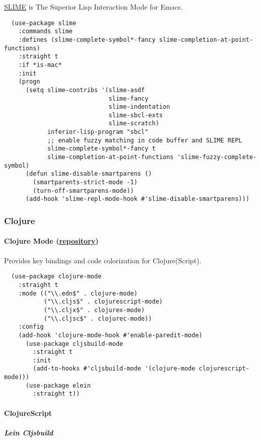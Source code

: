 \documentclass[11pt]{article}
\begin{document}
\href{https://common-lisp.net/project/slime/}{SLIME} is The Superior Lisp Interaction Mode for Emacs.

\begin{verbatim}
  (use-package slime
    :commands slime
    :defines (slime-complete-symbol*-fancy slime-completion-at-point-functions)
    :straight t
    :if *is-mac*
    :init
    (progn
      (setq slime-contribs '(slime-asdf
                             slime-fancy
                             slime-indentation
                             slime-sbcl-exts
                             slime-scratch)
            inferior-lisp-program "sbcl"
            ;; enable fuzzy matching in code buffer and SLIME REPL
            slime-complete-symbol*-fancy t
            slime-completion-at-point-functions 'slime-fuzzy-complete-symbol)
      (defun slime-disable-smartparens ()
        (smartparents-strict-mode -1)
        (turn-off-smartparens-mode))
      (add-hook 'slime-repl-mode-hook #'slime-disable-smartparens)))
\end{verbatim}
\subsubsection*{Clojure}
\label{sec:org96fec5d}
\paragraph*{Clojure Mode (\href{https://gihub.com/clojure-emacs/clojure-mode}{repository})}
\label{sec:org9356563}

Provides key bindings and code colorization for Clojure(Script).

\begin{verbatim}
  (use-package clojure-mode
    :straight t
    :mode (("\\.edn$" . clojure-mode)
           ("\\.cljs$" . clojurescript-mode)
           ("\\.cljx$" . clojurex-mode)
           ("\\.cljsc$" . clojurec-mode))
    :config
    (add-hook 'clojure-mode-hook #'enable-paredit-mode)
      (use-package cljsbuild-mode
        :straight t
        :init
        (add-to-hooks #'cljsbuild-mode '(clojure-mode clojurescript-mode)))
      (use-package elein
        :straight t))
\end{verbatim}

\paragraph*{ClojureScript}
\label{sec:org3e47482}
\subparagraph*{Lein Cljsbuild}
\label{sec:org8074c38}
\end{document}
